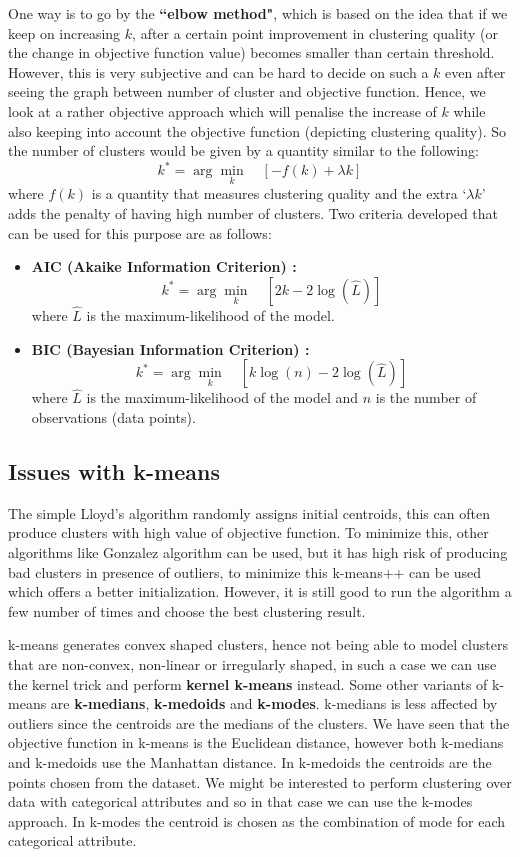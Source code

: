 \documentclass[12pt,a4paper]{article}
\begin{document}
One way is to go by the \textbf{``elbow method"}, which is based on the idea that if we keep on increasing $k$, after a certain point improvement in clustering quality (or the change in objective function value) becomes smaller than certain threshold. However, this is very subjective and can be hard to decide on such a $k$ even after seeing the graph between number of cluster and objective function. Hence, we look at a rather objective approach which will penalise the increase of $k$ while also keeping into account the objective function (depicting clustering quality). So the number of clusters would be given by a quantity similar to the following: $$k^* = \arg \min_k \quad [-f(k) + \lambda k]$$ where $f(k)$ is a quantity that measures clustering quality and the extra `$\lambda k$' adds the penalty of having high number of clusters. Two criteria developed that can be used for this purpose are as follows:
\begin{itemize}
    \item \textbf{AIC (Akaike Information Criterion) :} $$k^* = \arg \min_{k} \quad [2k - 2 \log{(\hat{L})}]$$ where $\hat{L}$ is the maximum-likelihood of the model.
    \item  \textbf{BIC (Bayesian Information Criterion) :} $$k^* = \arg \min_{k} \quad [k \log(n) - 2\log{(\hat{L})}]$$ where $\hat{L}$ is the maximum-likelihood of the model and $n$ is the number of observations (data points).
\end{itemize}

\subsection{Issues with k-means}

The simple Lloyd's algorithm randomly assigns initial centroids, this can often produce clusters with high value of objective function. To minimize this, other algorithms like Gonzalez algorithm can be used, but it has high risk of producing bad clusters in presence of outliers, to minimize this k-means++ can be used which offers a better initialization. However, it is still good to run the algorithm a few number of times and choose the best clustering result.

k-means generates convex shaped clusters, hence not being able to model clusters that are non-convex, non-linear or irregularly shaped, in such a case we can use the kernel trick and perform \textbf{kernel k-means} instead. Some other variants of k-means are \textbf{k-medians}, \textbf{k-medoids} and \textbf{k-modes}. k-medians is less affected by outliers since the centroids are the medians of the clusters. We have seen that the objective function in k-means is the Euclidean distance, however both k-medians and k-medoids use the Manhattan distance. In k-medoids the centroids are the points chosen from the dataset. We might be interested to perform clustering over data with categorical attributes and so in that case we can use the k-modes approach. In k-modes the centroid is chosen as the combination of mode for each categorical attribute.
\end{document}
